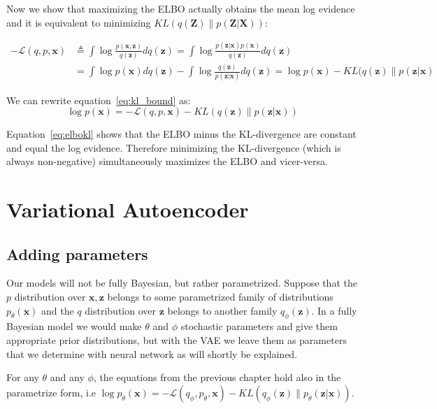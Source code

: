 \documentclass[11pt, a4paper]{report}
\theoremstyle{plain}
\theoremstyle{definition}
\theoremstyle{remark}
\newcommand{\x}{\mathbf{x}}
\newcommand{\z}{\mathbf{z}}
\newcommand{\bv}[1]{\boldsymbol{#1}}
\begin{document}
Now we show that maximizing the ELBO actually obtains the mean log evidence and it is
equivalent to minimizing $KL(q(\bv{Z}) \| p(\bv{Z}|\bv{X}))$:

\begin{equation}\label{eq:kl_bound}
\begin{aligned}
-\mathcal{L}(q,p,\x) &\triangleq \int \log \frac{p(\bv{x},\bv{z})}{q(\bv{z})} d
q(\bv{z})
= \int \log \frac{p(\bv{z}|\bv{x})p(\bv{x})}{q(\bv{z})} d q(\bv{z}) \\
&= \int \log p(\bv{x}) dq(\bv{z}) - \int \log \frac{q(\bv{z})}{p(\bv{z}|\bv{x})}
dq(\bv{z}) 
= \log p(\bv{x}) - KL(q(\bv{z}) \| p(\bv{z}|\bv{x})
\end{aligned}
\end{equation}

We can rewrite equation~\ref{eq:kl_bound} as:
\begin{equation}\label{eq:elbokl}
\log p(\bv{x}) = -\mathcal{L}(q,p,\x) - KL(q(\bv{z}) \| p(\bv{z}|\bv{x}))
\end{equation}

Equation~\ref{eq:elbokl} shows that the ELBO minus the KL-divergence are constant
and equal the log evidence. Therefore minimizing the KL-divergence (which is
always non-negative) simultaneously maximizes the ELBO and vicer-versa.

\section{Variational Autoencoder}
\subsection{Adding parameters}

Our models will not be fully Bayesian, but rather parametrized.
Suppose that the $p$ distribution over $\x,\z$ belongs to some parametrized family of
distributions $p_{\theta}(\x)$ and the $q$ distribution over $\z$ belongs to another
family $q_{\phi}(\z)$. In a fully Bayesian model we would make $\theta$ and
$\phi$ stochastic parameters and give them appropriate prior distributions, but
with the VAE we leave them as parameters that we determine with neural network
as will shortly be explained.

For any $\theta$ and any $\phi$, the equations from the previous chapter hold
also in the parametrize form, i.e 
$\log p_{\theta}(\x) =
-\mathcal{L}(q_{\phi},p_{\theta},\x) -
KL(q_{\phi}(\z) \| p_{\theta}(\z|\x))$.
\end{document}
